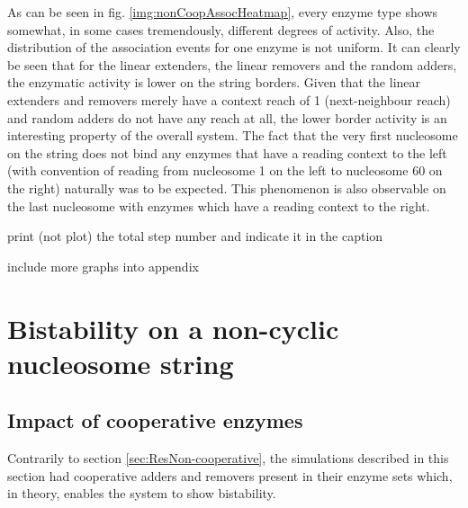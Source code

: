         As can be seen in fig. \ref{img:nonCoopAssocHeatmap}, every enzyme type shows somewhat, in some cases tremendously, different degrees of activity. Also, the distribution of the association events for one enzyme is not uniform. It can clearly be seen that for the linear extenders, the linear removers and the random adders, the enzymatic activity is lower on the string borders. Given that the linear extenders and removers merely have a context reach of 1 (next-neighbour reach) and random adders do not have any reach at all, the lower border activity is an interesting property of the overall system. The fact that the very first nucleosome on the string does not bind any enzymes that have a reading context to the left (with convention of reading from nucleosome 1 on the left to nucleosome 60 on the right) naturally was to be expected. This phenomenon is also observable on the last nucleosome with enzymes which have a reading context to the right.

        \begin{itemize}
            {
                \color{red}
                \item print (not plot) the total step number and indicate it in the caption
                \item include more graphs into appendix
            }
        \end{itemize}
    \newpage
    \section{Bistability on a non-cyclic nucleosome string}
        \label{sec:ResNonCyc}
        \subsection{Impact of cooperative enzymes}
            Contrarily to section \ref{sec:ResNon-cooperative}, the simulations described in this section had cooperative adders and removers present in their enzyme sets which, in theory, enables the system to show bistability.

